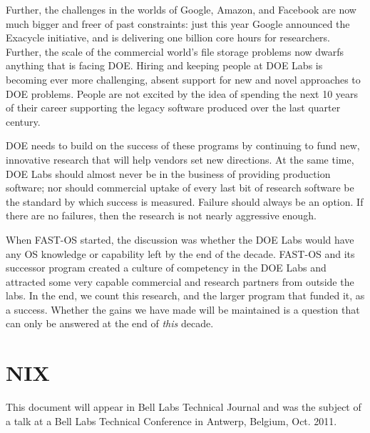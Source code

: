 \documentclass{report}
\begin{document}
Further, the challenges 
in the worlds of Google, Amazon, and Facebook are now much bigger 
and freer of past constraints: just this year Google announced 
the Exacycle initiative, and is delivering one billion core
hours for researchers. 
Further, the scale of the commercial world's file storage problems now dwarfs 
anything that is facing DOE. Hiring and keeping people at 
DOE Labs is becoming ever more challenging, absent support for 
new and novel approaches to DOE problems. People are not excited
by the idea of spending the next 10 years of their career supporting 
the legacy software produced over the last quarter century. 

DOE needs to build on the success of these programs by continuing
to fund new, innovative research that will 
help vendors set new directions. 
At the same time, DOE Labs should almost never be in the business of 
providing production software; 
nor should commercial uptake of every last bit of research software
be the standard 
by which success is measured. 
Failure should always be an option. If there are no failures, 
then the research is not nearly aggressive enough. 

When FAST-OS started, the discussion was whether the DOE Labs would have any OS 
knowledge or capability left by the end of the decade. FAST-OS and its successor
program created a culture of competency in the DOE Labs and attracted some very 
capable commercial and research partners  from outside the labs. 
In the end, we count this research, 
and the larger program that funded it, as a success. Whether
the gains we have made will be maintained is a question that can only 
be answered at the end of {\em this} decade. 

% 




\appendix
\appendixpage
\section*{NIX}
This document will appear in Bell Labs Technical Journal and was the subject
of a talk at a Bell Labs Technical Conference in Antwerp, Belgium, Oct. 2011. 
\newpage


\addappheadtotoc
\end{document}
